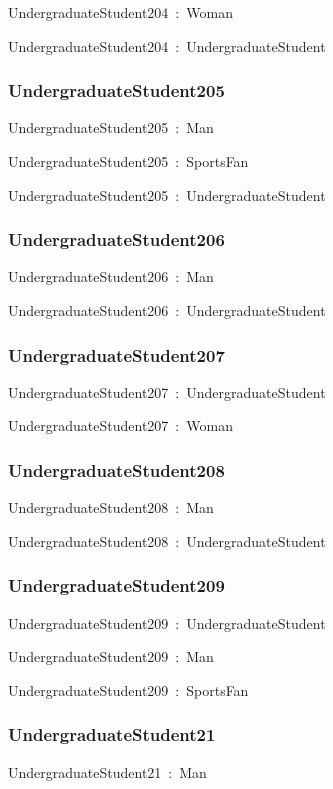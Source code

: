 \documentclass{article}
\begin{document}
UndergraduateStudent204~:~Woman

UndergraduateStudent204~:~UndergraduateStudent

\subsubsection*{UndergraduateStudent205}

UndergraduateStudent205~:~Man

UndergraduateStudent205~:~SportsFan

UndergraduateStudent205~:~UndergraduateStudent

\subsubsection*{UndergraduateStudent206}

UndergraduateStudent206~:~Man

UndergraduateStudent206~:~UndergraduateStudent

\subsubsection*{UndergraduateStudent207}

UndergraduateStudent207~:~UndergraduateStudent

UndergraduateStudent207~:~Woman

\subsubsection*{UndergraduateStudent208}

UndergraduateStudent208~:~Man

UndergraduateStudent208~:~UndergraduateStudent

\subsubsection*{UndergraduateStudent209}

UndergraduateStudent209~:~UndergraduateStudent

UndergraduateStudent209~:~Man

UndergraduateStudent209~:~SportsFan

\subsubsection*{UndergraduateStudent21}

UndergraduateStudent21~:~Man
\end{document}

